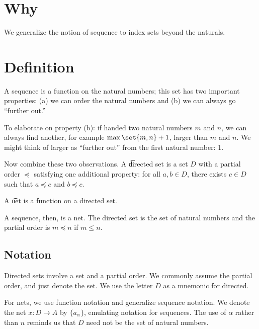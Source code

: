 
\section*{Why}

We generalize the notion of sequence to index sets beyond the naturals.
\section*{Definition}

A sequence is a function on the natural numbers; this set has two important properties: (a) we can order the natural numbers and (b) we can always go ``further out.''

To elaborate on property (b):
if handed two natural numbers
$m$ and $n$,
we can always find another,
for example $\max\set{m,n}+1$,
larger than $m$ and $n$.
We might think of larger as
``further out'' from the
first natural number: 1.

Now combine these two observations.
A \t{directed set} is a set $D$ with a partial order $\preceq$ satisfying one additional property: for all $a, b \in D$, there exists $c \in D$ such that $a \preceq c$ and $b \preceq c$.

A \t{net} is a function on a directed set.

A sequence, then, is a net.
The directed set is the set of natural numbers and the partial order is $m \preceq n$ if $m \leq n$.

\subsection*{Notation}

Directed sets involve a set and a partial order.
We commonly assume the partial order, and just denote the set.
We use the letter $D$ as a mnemonic for directed.

For nets, we use function notation and generalize sequence notation.
We denote the net $x: D \to A$ by $\{a_{\alpha }\}$, emulating notation for sequences.
The use of $\alpha $ rather than $n$ reminds us that $D$ need not be the set of natural numbers.

